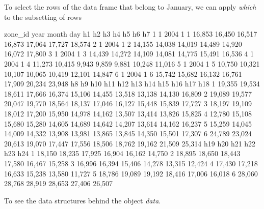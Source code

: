 \documentclass{article}
\begin{document}
To select the rows of the data frame that belong to January, we can apply
\textit{which} to the subsetting of rows

\begin{Schunk}
\begin{Soutput}
  zone_id year month day     h1     h2     h3     h4     h5     h6     h7
1       1 2004     1   1 16,853 16,450 16,517 16,873 17,064 17,727 18,574
2       1 2004     1   2 14,155 14,038 14,019 14,489 14,920 16,072 17,800
3       1 2004     1   3 14,439 14,272 14,109 14,081 14,775 15,491 16,536
4       1 2004     1   4 11,273 10,415  9,943  9,859  9,881 10,248 11,016
5       1 2004     1   5 10,750 10,321 10,107 10,065 10,419 12,101 14,847
6       1 2004     1   6 15,742 15,682 16,132 16,761 17,909 20,234 23,948
      h8     h9    h10    h11    h12    h13    h14    h15    h16    h17    h18
1 19,355 19,534 18,611 17,666 16,374 15,106 14,455 13,518 13,138 14,130 16,809
2 19,089 19,577 20,047 19,770 18,564 18,137 17,046 16,127 15,448 15,839 17,727
3 18,197 19,109 18,012 17,200 15,950 14,978 14,162 13,507 13,414 13,826 15,825
4 12,780 15,108 15,680 15,280 14,605 14,689 14,642 14,207 13,614 14,162 16,237
5 15,259 14,045 14,009 14,332 13,908 13,981 13,865 13,845 14,350 15,501 17,307
6 24,789 23,024 20,613 19,070 17,447 17,556 18,506 18,762 19,162 21,509 25,314
     h19    h20    h21    h22    h23    h24
1 18,150 18,235 17,925 16,904 16,162 14,750
2 18,895 18,650 18,443 17,580 16,467 15,258
3 16,996 16,394 15,406 14,278 13,315 12,424
4 17,430 17,218 16,633 15,238 13,580 11,727
5 18,786 19,089 19,192 18,416 17,006 16,018
6 28,060 28,768 28,919 28,653 27,406 26,507
\end{Soutput}
\end{Schunk}

To see the data structures behind the object \textit{data}.
\end{document}
